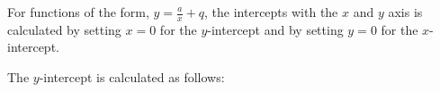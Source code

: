           
          \label{m39341*id247720}For functions of the form, \begin{math}y=\frac{a}{x}+q\end{math}, the intercepts with the \begin{math}x\end{math} and \begin{math}y\end{math} axis is calculated by setting \begin{math}x=0\end{math} for the \begin{math}y\end{math}-intercept and by setting \begin{math}y=0\end{math} for the \begin{math}x\end{math}-intercept.\par 
          \label{m39341*id247814}The \begin{math}y\end{math}-intercept is calculated as follows:\par 
          \label{m39341*uid154}\nopagebreak\noindent{}
    

